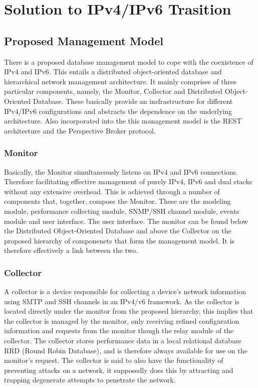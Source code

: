 
%
\section{Solution to IPv4/IPv6 Trasition}

\subsection{Proposed Management Model}
There is a proposed database management model to cope with the coexistence of IPv4 and IPv6. This entails a distributed object-oriented database and hierarchical network management architecture. It mainly comprises of three particular components, namely, the Monitor, Collector and Distributed Object-
Oriented Database. These basically provide an insfrastructure for different IPv4/IPv6 configurations and abstracts the dependence on the underlying architecture. Also incorporated into the this management model is the REST architecture and the Perspective Broker protocol. \cite{Zhao}

\subsubsection{Monitor}
Basically, the Monitor simultaneously listens on IPv4 and IPv6 connections. Therefore facilitating effective management of purely IPv4, IPv6 and dual stacks without any extensive overhead. This is achieved through a number of components that, together, compose the Monitor. These are the modeling module, performance
collecting module, SNMP/SSH channel module, events module and user interface. The user interface. The monitor can be found below the Distributed Object-Oriented Database and above the Collector on the proposed hierarchy of componenets that form the management model. It is therefore effectively a link between the two.

\subsubsection{Collector}
A collector is a device responsible for collecting a device’s network information using SMTP and SSH channels in an IPv4/v6 framework. As the collector is located directly under the monitor from the proposed hierarchy, this implies that the collector is managed by the monitor, only receiving refined configuration information and requests from the monitor though the relay module of the collector. 
The collector stores performance data in a local relational database RRD (Round Robin Database), and is therefore always available for use on the monitor’s request.
The collector is said to also have the functionality of preventing attacks on a network, it supposedly does this by attracting and trapping degenerate attempts to penetrate the network. \cite{Baker}


